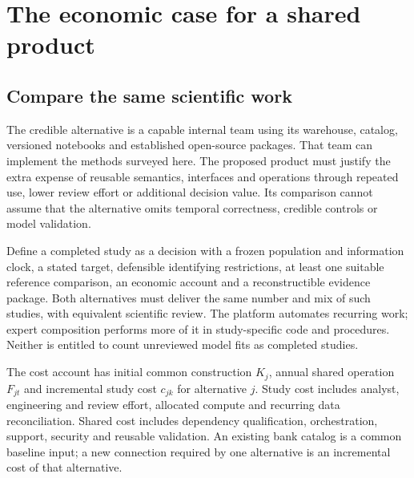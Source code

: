 \chapter{The economic case for a shared product}\label{ch:economics}
\section{Compare the same scientific work}
The credible alternative is a capable internal team using its warehouse,
catalog, versioned notebooks and established open-source packages. That
team can implement the methods surveyed here. The proposed product must
justify the extra expense of reusable semantics, interfaces and operations
through repeated use, lower review effort or additional decision value.
Its comparison cannot assume that the alternative omits temporal correctness,
credible controls or model validation.

Define a completed study as a decision with a frozen population and
information clock, a stated target, defensible identifying restrictions,
at least one suitable reference comparison, an economic account and a
reconstructible evidence package. Both alternatives must deliver the same
number and mix of such studies, with equivalent scientific review.
The platform automates recurring work; expert composition performs more
of it in study-specific code and procedures. Neither is entitled to count
unreviewed model fits as completed studies.

The cost account has initial common construction $K_j$, annual shared
operation $F_{jt}$ and incremental study cost $c_{jk}$ for alternative
$j$. Study cost includes analyst, engineering and review effort, allocated
compute and recurring data reconciliation. Shared cost includes dependency
qualification, orchestration, support, security and reusable validation.
An existing bank catalog is a common baseline input; a new connection
required by one alternative is an incremental cost of that alternative.


